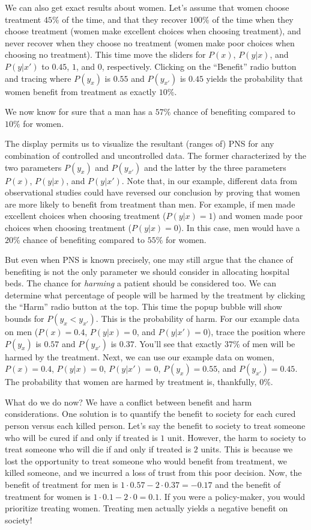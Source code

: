 \documentclass{article}
\begin{document}
We can also get exact results about women. Let's assume that women choose treatment $45\%$ of the time, and that they recover $100\%$ of the time when they choose treatment (women make excellent choices when choosing treatment), and never recover when they choose no treatment (women make poor choices when choosing no treatment). This time move the sliders for $P(x)$, $P(y|x)$, and $P(y|x')$ to $0.45$, $1$, and $0$, respectively. Clicking on the ``Benefit'' radio button and tracing where $P(y_x)$ is $0.55$ and $P(y_{x'})$ is $0.45$ yields the probability that women benefit from treatment as exactly $10\%$.

We now know for sure that a man has a $57\%$ chance of benefiting compared to $10\%$ for women.

The display permits us to visualize the resultant (ranges of) PNS for any combination of controlled and uncontrolled data. The former characterized by the two parameters $P(y_x)$ and $P(y_{x'})$ and the latter by the three parameters $P(x)$, $P(y|x)$, and $P(y|x')$. Note that, in our example, different data from observational studies could have reversed our conclusion by proving that women are more likely to benefit from treatment than men. For example, if men made excellent choices when choosing treatment ($P(y|x) = 1$) and women made poor choices when choosing treatment ($P(y|x) = 0$). In this case, men would have a $20\%$ chance of benefiting compared to $55\%$ for women.

But even when PNS is known precisely, one may still argue that the chance of benefiting is not the only parameter we should consider in allocating hospital beds. The chance for \emph{harming} a patient should be considered too. We can determine what percentage of people will be harmed by the treatment by clicking the ``Harm'' radio button at the top. This time the popup bubble will show bounds for $P(y_x < y_{x'})$. This is the probability of harm. For our example data on men ($P(x) = 0.4$, $P(y|x) = 0$, and $P(y|x') = 0$), trace the position where $P(y_x)$ is $0.57$ and $P(y_{x'})$ is $0.37$. You'll see that exactly $37\%$ of men will be harmed by the treatment. Next, we can use our example data on women, $P(x) = 0.4$, $P(y|x) = 0$, $P(y|x') = 0$, $P(y_x) = 0.55$, and $P(y_{x'}) = 0.45$. The probability that women are harmed by treatment is, thankfully, $0\%$.

What do we do now? We have a conflict between benefit and harm considerations. One solution is to quantify the benefit to society for each cured person versus each killed person. Let's say the benefit to society to treat someone who will be cured if and only if treated is $1$ unit. However, the harm to society to treat someone who will die if and only if treated is $2$ units. This is because we lost the opportunity to treat someone who would benefit from treatment, we killed someone, and we incurred a loss of trust from this poor decision. Now, the benefit of treatment for men is $1 \cdot 0.57 - 2 \cdot 0.37 = -0.17$ and the benefit of treatment for women is $1 \cdot 0.1 - 2 \cdot 0 = 0.1$. If you were a policy-maker, you would prioritize treating women. Treating men actually yields a negative benefit on society!
\end{document}
